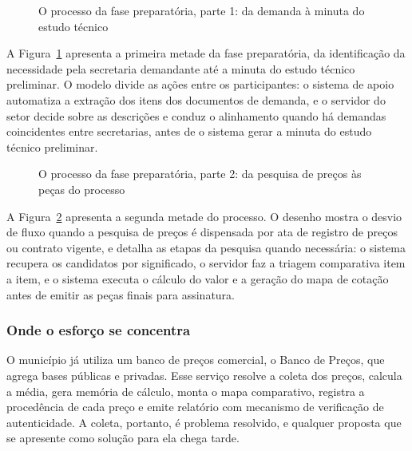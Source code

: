 %
\begin{figure}[H]
  \centering
  
  \caption{O processo da fase preparatória, parte 1: da demanda à minuta do
    estudo técnico}
  \label{fig:processo-bpmn-1}
\end{figure}

A Figura~\ref{fig:processo-bpmn-1} apresenta a primeira metade da fase
preparatória, da identificação da necessidade pela secretaria demandante até a
minuta do estudo técnico preliminar. O modelo divide as ações entre os
participantes: o sistema de apoio automatiza a extração dos itens dos documentos
de demanda, e o servidor do setor decide sobre as descrições e conduz o
alinhamento quando há demandas coincidentes entre secretarias, antes de o sistema
gerar a minuta do estudo técnico preliminar.

\begin{figure}[H]
  \centering
  
  \caption{O processo da fase preparatória, parte 2: da pesquisa de preços às
    peças do processo}
  \label{fig:processo-bpmn-2}
\end{figure}

A Figura~\ref{fig:processo-bpmn-2} apresenta a segunda metade do processo. O
desenho mostra o desvio de fluxo quando a pesquisa de preços é dispensada por
ata de registro de preços ou contrato vigente, e detalha as etapas da pesquisa
quando necessária: o sistema recupera os candidatos por significado, o servidor
faz a triagem comparativa item a item, e o sistema executa o cálculo do valor e
a geração do mapa de cotação antes de emitir as peças finais para assinatura.

\subsubsection{Onde o esforço se concentra}
\label{subsec:onde-doi}

O município já utiliza um banco de preços comercial, o Banco de Preços, que
agrega bases públicas e privadas. Esse serviço resolve a coleta dos preços,
calcula a média, gera memória de cálculo, monta o mapa comparativo, registra a
procedência de cada preço e emite relatório com mecanismo de verificação de
autenticidade. A coleta, portanto, é problema resolvido, e qualquer proposta que
se apresente como solução para ela chega tarde.

